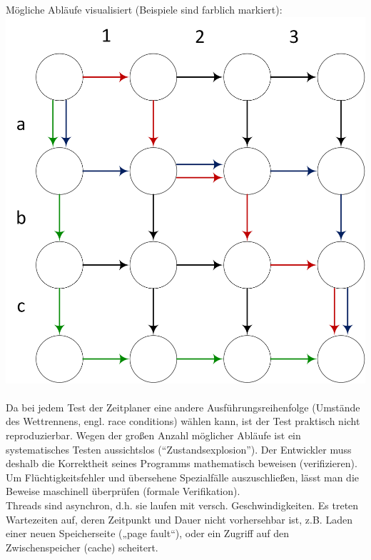 Mögliche Abläufe visualisiert (Beispiele sind farblich markiert):\\
\includegraphics[width=.4\textwidth]{Nondeterminism}\\
\\
Da bei jedem Test der Zeitplaner eine andere Ausführungsreihenfolge (Umstände des Wettrennens, engl. race conditions) wählen kann, ist der Test praktisch nicht reproduzierbar. Wegen der großen Anzahl möglicher Abläufe ist ein systematisches Testen aussichtslos ("`Zustandsexplosion"').
Der Entwickler muss deshalb die Korrektheit seines Programms mathematisch beweisen (verifizieren). Um Flüchtigkeitsfehler und übersehene Spezialfälle auszuschließen, lässt man die Beweise maschinell überprüfen (formale Verifikation).
\\
Threads sind asynchron, d.h. sie laufen mit versch. Geschwindigkeiten. Es treten Wartezeiten auf, deren Zeitpunkt und Dauer nicht vorhersehbar ist, z.B. Laden einer neuen Speicherseite („page fault“), oder ein Zugriff auf den Zwischenspeicher (cache) scheitert.

